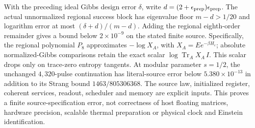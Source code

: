 With the preceding ideal Gibbs design error $\delta$, write
$d=(2+\epsilon_{\rm prep})\epsilon_{\rm prep}$. The actual unnormalized
regional success block has eigenvalue floor $m-d>1/20$ and logarithm
error at most $(\delta+d)/(m-d)$. Adding the regional eighth-order
remainder gives a bound below $2\times10^{-9}$ on the stated finite
source. Specifically, the regional polynomial $P_8$ approximates
$-\log X_A$, with $X_A=E e^{-\beta H_c}$; absolute normalized-Gibbs
comparisons retain the exact scalar $\log\operatorname{Tr}_A X_A\,I$.
This scalar drops only on trace-zero entropy tangents.
At modular parameter $s=1/2$, the unchanged $4{,}320$-pulse continuation
has literal-source error below $5.380\times10^{-13}$ in addition to its
Strang bound $1463/805306368$. The source law, initialized register,
coherent services, readout, scheduler and memory are explicit inputs.
This proves a finite source-specification error, not correctness of host
floating matrices, hardware precision, scalable thermal preparation or
physical clock and Einstein identification.
